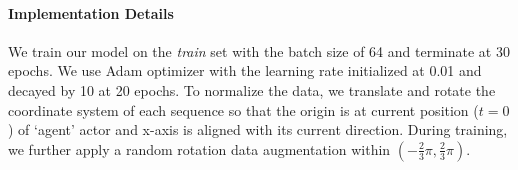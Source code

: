 \paragraph{Implementation Details}
We train our model on the \emph{train} set with the batch size of 64 and terminate at 30
epochs. We use Adam \cite{adam} optimizer with the learning rate initialized at 0.01 and decayed by 10 at 20 epochs. To normalize the data, we translate and rotate the coordinate system of each sequence so that
the origin is at current position ($t=0$) of `agent' actor and x-axis is aligned
with its current direction. During training, we further apply a random rotation
data augmentation within $(-\frac{2}{3}\pi, \frac{2}{3}\pi)$. 

